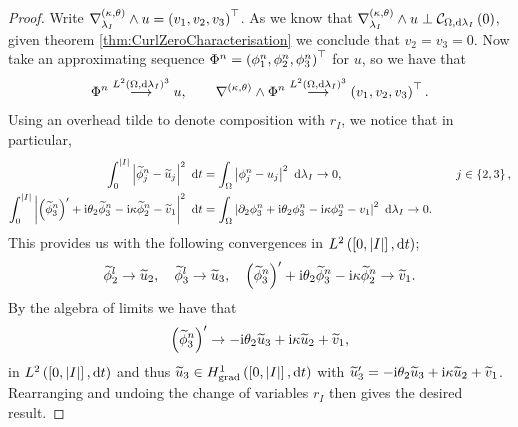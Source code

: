 \begin{proof}
	Write $\nabla_{\lambda_I}^{\left( \kappa, \theta \right)}\wedge u = \left( v_1, v_2, v_3 \right)^\top$.
	As we know that $\nabla_{\lambda_I}^{\left( \kappa, \theta \right)}\wedge u \perp \mathcal{C}_{ \Omega, \mathrm{d}\lambda_I}\left( 0 \right)$, given theorem \ref{thm:CurlZeroCharacterisation} we conclude that $v_2 = v_3 = 0$.
	Now take an approximating sequence $\Phi^n = \left( \phi^n_1, \phi^n_2, \phi^n_3 \right)^\top$ for $u$, so we have that
	\begin{align*}
		\Phi^n \overset{ L^{2}\left( \Omega,\mathrm{d}\lambda_I \right)^3 }{\longrightarrow} u, \qquad \nabla_{}^{\left( \kappa, \theta \right)}\wedge\Phi^n \overset{ L^{2}\left( \Omega,\mathrm{d}\lambda_I \right)^3 }{\longrightarrow} \left( v_1, v_2, v_3 \right)^\top.
	\end{align*}
	Using an overhead tilde to denote composition with $r_I$, we notice that in particular,
	\begin{align*}
		\int_0^{\left\lvert I \right\rvert} \left\lvert \widetilde{\phi}^n_j - \widetilde{u}_j \right\rvert^2 \ \mathrm{d} t
		&= \int_{\Omega} \left\lvert \phi^n_j - u_j \right\rvert^2  \ \mathrm{d}\lambda_I 
		\rightarrow 0, &\quad j\in\left\{ 2,3 \right\}, \\
		\int_0^{\left\lvert I \right\rvert} \left\lvert  \left( \widetilde{\phi}^n_3 \right)' + \mathrm{i}\theta_2\widetilde{\phi}^n_3 - \mathrm{i}\kappa\widetilde{\phi}^n_2 - \widetilde{v}_1  \right\rvert^2 \ \mathrm{d} t
		&= \int_{\Omega} \left\lvert  \partial_2\phi^n_3 + \mathrm{i}\theta_2\phi^n_3 - \mathrm{i}\kappa\phi^n_2 - v_1  \right\rvert^2  \ \mathrm{d}\lambda_I
		\rightarrow 0.
	\end{align*}
	This provides us with the following convergences in $L^{2}\left( \left[ 0,\left\lvert I \right\rvert \right],\mathrm{d}t \right)$;
	\begin{align*}
		\widetilde{\phi}^l_2 \rightarrow \widetilde{u}_2, \quad
		\widetilde{\phi}^l_3 \rightarrow \widetilde{u}_3, \quad
		\left( \widetilde{\phi}^n_3 \right)' + \mathrm{i}\theta_2\widetilde{\phi}^n_3 - \mathrm{i}\kappa\widetilde{\phi}^n_2 \rightarrow \widetilde{v}_1.
	\end{align*}
	By the algebra of limits we have that
	\begin{align*}
		\left( \widetilde{\phi}^n_3 \right)' \rightarrow -\mathrm{i}\theta_2\widetilde{u}_3 + \mathrm{i}\kappa\widetilde{u}_2 + \widetilde{v}_1,
	\end{align*}
	in $L^{2}\left( \left[ 0,\left\lvert I \right\rvert \right],\mathrm{d}t \right)$ and thus $\widetilde{u}_3\in H^1_\mathrm{grad}\left( \left[ 0,\left\lvert I \right\rvert \right], \mathrm{d}t \right)$ with $\widetilde{u}_3' = -\mathrm{i}\theta_2\widetilde{u}_3 + \mathrm{i}\kappa\widetilde{u}_2 + \widetilde{v}_1$.
	Rearranging and undoing the change of variables $r_I$ then gives the desired result.
\end{proof}

